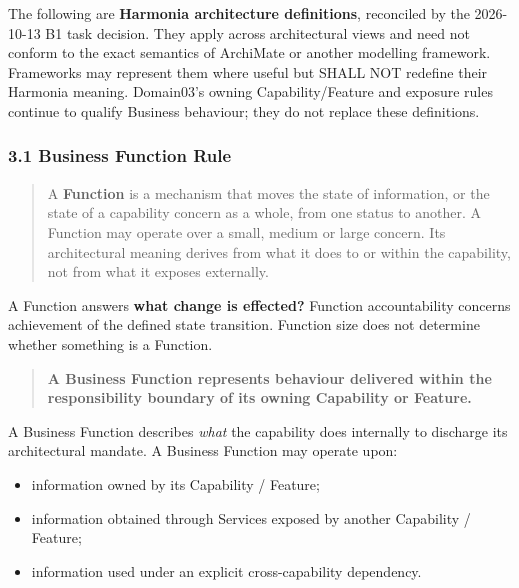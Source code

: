 \label{rad:metamodel:97}

The following are \textbf{Harmonia architecture definitions}, reconciled by the 2026-10-13 B1 task decision. They apply across architectural views and need not conform to the exact semantics of ArchiMate or another modelling framework. Frameworks may represent them where useful but SHALL NOT redefine their Harmonia meaning. Domain03's owning Capability/\allowbreak{}Feature and exposure rules continue to qualify Business behaviour; they do not replace these definitions.

\label{rad:metamodel:104}
\subsubsection*{3.1 Business Function Rule}
\label{rad:metamodel:106}

\begin{quote}

A \textbf{Function} is a mechanism that moves the state of information, or the state of a capability concern as a whole, from one status to another. A Function may operate over a small, medium or large concern. Its architectural meaning derives from what it does to or within the capability, not from what it exposes externally.


\end{quote}
\label{rad:metamodel:112}

A Function answers \textbf{what change is effected?} Function accountability concerns achievement of the defined state transition. Function size does not determine whether something is a Function.

\label{rad:metamodel:116}

\begin{quote}

\textbf{A Business Function represents behaviour delivered within the responsibility boundary of its owning Capability or Feature.}


\end{quote}
\label{rad:metamodel:118}

A Business Function describes \emph{what} the capability does internally to discharge its architectural mandate. A Business Function may operate upon:

\label{rad:metamodel:119}

\begin{itemize}

\item 
information owned by its Capability /\allowbreak{} Feature;



\item 
information obtained through Services exposed by another Capability /\allowbreak{} Feature;



\item 
information used under an explicit cross-capability dependency.



\end{itemize}
\label{rad:metamodel:123}

